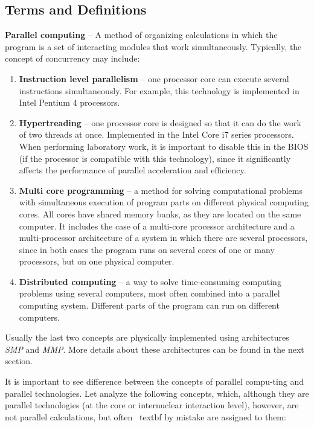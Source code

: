 { %
	\subsection{Terms and Definitions}
	\par\textbf{Parallel computing} -- 
A method of organizing calculations in which the program is a set of interacting modules that work simultaneously. Typically, the concept of concurrency may include:
		\begin{enumerate}

			\item\textbf{Instruction level parallelism} -- one processor core can execute several instructions simultaneously. For example, this technology is implemented in Intel Pentium 4 processors.
			\item\textbf{Hypertreading} -- one processor core is designed so that it can do the work of two threads at once. Implemented in the Intel Core i7 series processors. When performing laboratory work, it is important to disable this in the BIOS (if the processor is compatible with this technology), since it significantly affects the performance of parallel acceleration and efficiency.
			\item\textbf{Multi core programming} --  a method for solving computational problems with simultaneous execution of program parts on different physical computing cores. All cores have shared memory banks, as they are located on the same computer. It includes the case of a multi-core processor architecture and a multi-processor architecture of a system in which there are several processors, since in both cases the program runs on several cores of one or many processors, but on one physical computer.
			\item\textbf{Distributed computing} -- a way to solve time-consuming computing problems using several computers, most often combined into a parallel computing system. Different parts of the program can run on different computers.
		\end{enumerate}
Usually the last two concepts are physically implemented using architectures \textit{SMP} and \textit{MMP}. More details about these architectures can be found in the next section.
	\par It is important to see difference between the concepts of parallel compu-ting and parallel technologies. Let  analyze the following concepts, which, although they are parallel technologies (at the core or internuclear interaction level), however, are not parallel calculations, but often \ textbf {by mistake} are assigned to them:
}
